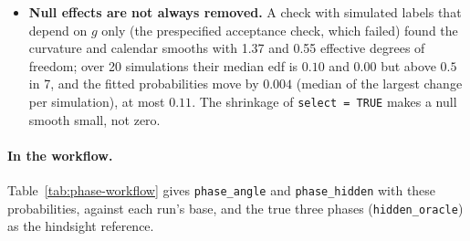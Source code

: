 \documentclass[11pt,a4paper]{article}
\theoremstyle{definition}
\theoremstyle{remark}
\begin{document}
\begin{itemize}[leftmargin=*,itemsep=3pt]
lead chosen per block gains $2.6\%$ on the longer history in all designs
($6.0\%$ after the peaks) and loses $0.2\%$ on the CMU base. The chosen lead
is 1 in most blocks; lead 2 has by far the worst predictive score (about 100
log-score units below lead 0 for O1, 15 to 19 for O2).
\item \textbf{Null effects are not always removed.} A check with simulated
labels that depend on $g$ only (the prespecified acceptance check, which
failed) found the curvature and calendar smooths with 1.37 and 0.55
effective degrees of freedom; over 20 simulations their median edf is $0.10$
and $0.00$ but above $0.5$ in 7, and the fitted probabilities move by $0.004$
(median of the largest change per simulation), at most $0.11$. The shrinkage
of \texttt{select = TRUE} makes a null smooth small, not zero.
\end{itemize}

\paragraph{In the workflow.}
Table~\ref{tab:phase-workflow} gives \texttt{phase\_angle} and
\texttt{phase\_hidden} with these probabilities, against each run's base,
and the true three phases (\texttt{hidden\_oracle}) as the hindsight
reference.
\end{document}
